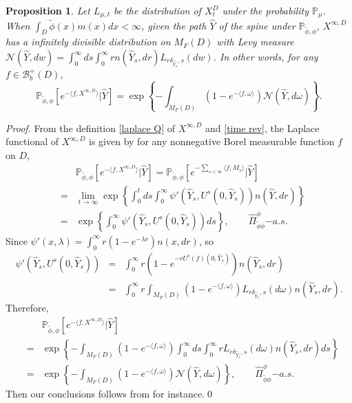 \documentclass[12pt,a4paper]{amsart}
\numberwithin{equation}{section}
\theoremstyle{plain}
\newtheorem{prop}[thm]{Proposition}
\theoremstyle{definition}
\begin{document}
\begin{prop}\label{eq:inf_div}
  Let $L_{\mu, t}$ be the distribution of $X^D_t$ under the probability $\mathbb P_\mu$.  When $\int_D\widetilde\phi(x)m(x)dx<\infty$, given the path $\widehat Y$ of the spine under $\mathbb P_{\widetilde\phi,\phi}$,  $X^{\infty,D}$ has a infinitely divisible distribution on $M_F(D)$ with Levy measure $\mathcal N(\widehat{Y}, dw)=\int_0^\infty ds\int_0^\infty r n(\widehat{Y}_s, dr)L_{r\delta_{\widehat{Y}_s}, s}(dw)$.  In other words, for any $f\in\mathcal B_b^+(D)$,
  \[
    \mathbb P_{\widetilde\phi,\phi}\left[e^{-\langle f,X^{\infty,D}\rangle }\big|\widehat{Y}\right]=\exp\left\{-\int_{M_F(D)}(1-e^{-\langle f,\omega\rangle })\mathcal N(\widehat{Y}, d\omega)\right\}.
  \]
\end{prop}
\begin{proof}
  From the definition \eqref{laplace Q} of $X^{\infty,D}$ and \eqref{time rev}, the Laplace functional of $X^{\infty,D}$ is given by for any nonnegative Borel measurable function $f$ on $D$,
  \begin{eqnarray*}
    &&\mathbb P_{\widetilde\phi,\phi}\left[e^{-\langle f,X^{\infty,D}\rangle }\big|\widehat{Y}\right]=\mathbb P_{\widetilde\phi,\phi}\left[e^{-\sum_{s<\infty}\langle f,M_s\rangle }\big|\widehat{Y}\right]\\
    & =&\lim_{t\rightarrow\infty}\exp\left\{\int_0^tds\int_0^\infty \psi'(\widehat Y_s, U^s(0,\widehat Y_s))n(\widehat Y, dr)\right\}\\
    &=&\exp\left\{\int_0^\infty \psi'(\widehat Y_s, U^s(0,\widehat Y_s))ds\right\},\qquad \widehat\Pi_{\widetilde\phi\phi}^\phi{\mathrm -a.s.}
  \end{eqnarray*}
  Since $\psi'(x,\lambda)=\int_0^\infty r(1-e^{-\lambda r})n(x,dr)$,  so
  \begin{eqnarray*}
    \psi'(\widehat Y_s, U^s(0,\widehat Y_s))&=&\int_0^\infty r
                                                (1-e^{-rU^s(f)(0,\widehat Y_s)})n(\widehat Y_s,dr)\\
                                            &=&\int_0^\infty r\int_{M_F(D)}(1-e^{-\langle f,\omega\rangle })L_{r\delta_{\widehat{Y}_s}, s}(d\omega)n(\widehat Y_s,dr).
  \end{eqnarray*}
  Therefore,
  \begin{eqnarray*}
    &&\mathbb P_{\widetilde\phi,\phi}\left[e^{-\langle f,X^{\infty,D}\rangle }\big|\widehat{Y}\right]\\
    &=&\exp\left\{-\int_{M_F(D)}(1-e^{-\langle f,\omega\rangle })\int_0^\infty ds\int_0^\infty rL_{r\delta_{\widehat{Y}_s}, s}(d\omega)n(\widehat Y_s,dr)ds\right\}\\
    &=&\exp\left\{-\int_{M_F(D)}(1-e^{-\langle f,\omega\rangle })\mathcal N(\widehat{Y}, d\omega)\right\},\qquad \widehat\Pi_{\widetilde\phi\phi}^\phi{\mathrm -a.s.}
  \end{eqnarray*}
  Then our conclusions follows from \cite[Theorem 3.4.1]{Dawson1992Infinitely} for instance.\qed
\end{proof}
\end{document}
